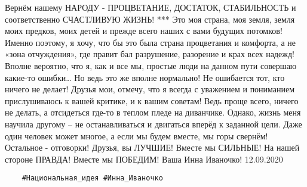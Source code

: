 Вернём нашему НАРОДУ - ПРОЦВЕТАНИЕ, ДОСТАТОК, СТАБИЛЬНОСТЬ и соответственно СЧАСТЛИВУЮ ЖИЗНЬ!
***
Это моя страна, моя земля, земля моих предков, моих детей и прежде всего наших с вами будущих потомков!
Именно поэтому, я хочу, что бы это была страна процветания и комфорта, а не «зона отчуждения», где правит бал разрушение, разорение и крах всех надежд!
Вполне вероятно, что я, как и все мы, простые люди на данном пути совершаю какие-то ошибки…
Но ведь это же вполне нормально!
Не ошибается тот, кто ничего не делает!
Друзья мои, отмечу, что я всегда с уважением и пониманием прислушиваюсь к вашей критике, и к вашим советам!
Ведь проще всего, ничего не делать, а отсидеться где-то в теплом пледе на диванчике.
Однако, жизнь меня научила другому – не останавливаться и двигаться вперёд к заданной цели.
Даже один человек может многое, а если мы будем вместе, мы горы свернём!
Остальное - отговорки!
Друзья, вы ЛУЧШИЕ!
Вместе мы СИЛЬНЫЕ!
На нашей стороне ПРАВДА!
Вместе мы ПОБЕДИМ!
Ваша Инна Иваночко!
12.09.2020
\restorecr
\begin{verbatim}
	#Национальная_идея #Инна_Иваночко
\end{verbatim}
